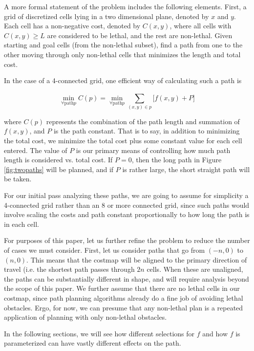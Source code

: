 A more formal statement of the problem includes the following elements. First, a grid of discretized cells lying in a two dimensional plane, denoted by $x$ and $y$. Each cell has a non-negative cost, denoted by $C(x,y)$, where all cells with $C(x,y)\ge L$ are considered to be lethal, and the rest are non-lethal.  Given starting and goal cells (from the non-lethal subset), find a path from one to the other moving through only non-lethal cells that minimizes the length and total cost. 

In the case of a 4-connected grid, one efficient way of calculating such a path is

\[ \min_{\forall \mathrm{path} p} C(p) = \min_{\forall \mathrm{path} p} \sum\limits_{(x,y) \in p}^{} \Big[ f(x,y) + P \Big] \]

where $C(p)$ represents the combination of the path length and summation of $f(x,y)$, and $P$ is the path constant. That is to say, in addition to minimizing the total cost, we minimize the total cost plus some constant value for each cell entered. The value of $P$ is our primary means of controlling how much path length is considered vs. total cost. If $P=0$, then the long path in Figure \ref{fig:twopaths} will be planned, and if $P$ is rather large, the short straight path will be taken. 


For our initial pass analyzing these paths, we are going to assume for simplicity a 4-connected grid rather than an 8 or more connected grid, since such paths would involve scaling the costs and path constant proportionally to how long the path is in each cell. 

For purposes of this paper, let us further refine the problem to reduce the number of cases we must consider. First, let us consider paths that go from $(-n, 0)$ to $(n, 0)$. This means that the costmap will be aligned to the primary direction of travel (i.e. the shortest path passes through $2n$ cells. When these are unaligned, the paths can be substantially different in shape, and will require analysis beyond the scope of this paper. We further assume that there are no lethal cells in our costmap, since path planning algorithms already do a fine job of avoiding lethal obstacles. Ergo, for now, we can presume that any non-lethal plan is a repeated application of planning with only non-lethal obstacles. 

In the following sections, we will see how different selections for $f$ and how $f$ is parameterized can have vastly different effects on the path. 
